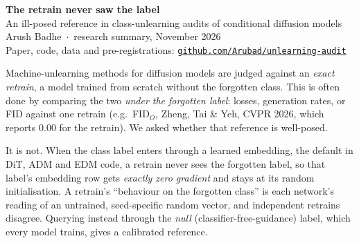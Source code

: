 \documentclass[10pt]{article}
\newcommand{\sect}[1]{\vspace{3pt}{\large\bfseries #1}\par\vspace{1pt}}
\begin{document}
{\LARGE\bfseries The retrain never saw the label}\\[2pt]
{\large An ill-posed reference in class-unlearning audits of conditional diffusion models}\\[3pt]
Arush Badhe \,$\cdot$\, research summary, November 2026\\ Paper, code, data and pre-registrations: \href{https://github.com/Arubad/unlearning-audit}{\texttt{github.com/Arubad/unlearning-audit}}

\sect{Problem}
Machine-unlearning methods for diffusion models are judged against an \emph{exact retrain}, a model trained from scratch without the forgotten class. This is often done by comparing the two \emph{under the forgotten label}: losses, generation rates, or FID against one retrain (e.g.\ FID$_O$, Zheng, Tai \& Yeh, CVPR 2026, which reports $0.00$ for the retrain). We asked whether that reference is well-posed.

\sect{Finding}
It is not. When the class label enters through a learned embedding, the default in DiT, ADM and EDM code, a retrain never sees the forgotten label, so that label's embedding row gets \emph{exactly zero gradient} and stays at its random initialisation. A retrain's ``behaviour on the forgotten class'' is each network's reading of an untrained, seed-specific random vector, and independent retrains disagree. Querying instead through the \emph{null} (classifier-free-guidance) label, which every model trains, gives a calibrated reference.
\end{document}
